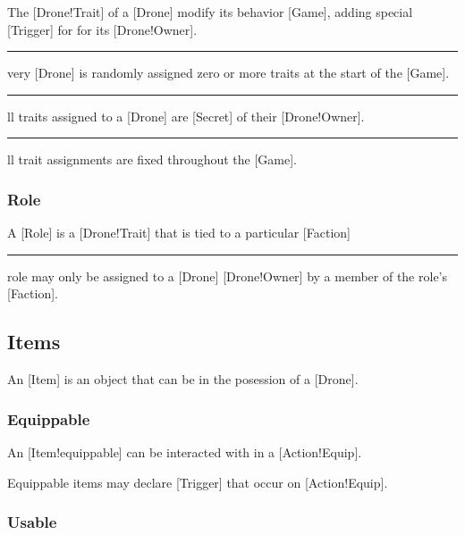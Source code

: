 The [Drone!Trait] of a [Drone] modify its behavior [Game], adding special [Trigger] for for its [Drone!Owner].

\begin{rules}
    \rule{drone.traits.init} Every [Drone] is randomly assigned zero or more traits at the start of the [Game].
    \rule{drone.traits.secret} All traits assigned to a [Drone] are [Secret] of their [Drone!Owner].
    \rule{drone.traits.const} All trait assignments are fixed throughout the [Game].
\end{rules}

\subsubsection{Role}

A [Role] is a [Drone!Trait] that is tied to a particular [Faction]

\begin{rules}
    \rule{drone.trait.role} A role may only be assigned to a [Drone] [Drone!Owner] by a member of the role's [Faction].
\end{rules}

\subsection{Items}

An [Item] is an object that can be in the posession of a [Drone].

\subsubsection{Equippable}

An [Item!equippable] can be interacted with in a [Action!Equip].

Equippable items may declare [Trigger] that occur on [Action!Equip].

\subsubsection{Usable}

